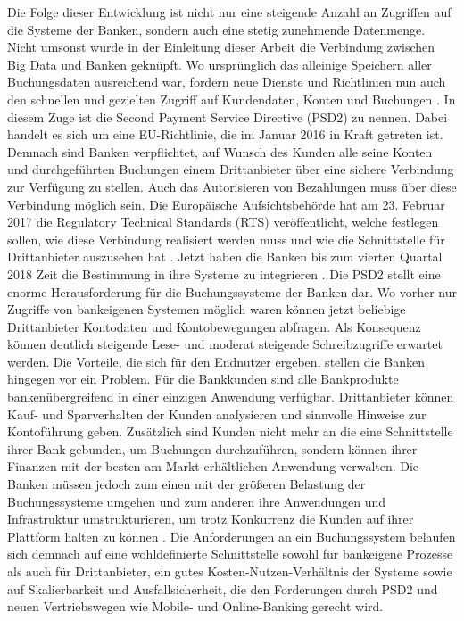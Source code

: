 \documentclass[12pt,oneside,a4paper,parskip]{scrbook}
\begin{document}
Die Folge dieser Entwicklung ist nicht nur eine steigende Anzahl an Zugriffen auf die Systeme der Banken, sondern auch eine stetig zunehmende Datenmenge. Nicht umsonst wurde in der Einleitung dieser Arbeit die Verbindung zwischen Big Data und Banken geknüpft. Wo ursprünglich das alleinige Speichern aller Buchungsdaten ausreichend war, fordern neue Dienste und Richtlinien nun auch den schnellen und gezielten Zugriff auf Kundendaten, Konten und Buchungen \cite{bigdataBigStorage}. In diesem Zuge ist die Second Payment Service Directive (PSD2) zu nennen. Dabei handelt es sich um eine EU-Richtlinie, die im Januar 2016 in Kraft getreten ist. Demnach sind Banken verpflichtet, auf Wunsch des Kunden alle seine Konten und durchgeführten Buchungen einem Drittanbieter über eine sichere Verbindung zur Verfügung zu stellen. Auch das Autorisieren von Bezahlungen muss über diese Verbindung möglich sein. Die Europäische Aufsichtsbehörde hat am 23. Februar 2017 die Regulatory Technical Standards (RTS) veröffentlicht, welche festlegen sollen, wie diese Verbindung realisiert werden muss und wie die Schnittstelle für Drittanbieter auszusehen hat \cite{rts}. Jetzt haben die Banken bis zum vierten Quartal 2018 Zeit die Bestimmung in ihre Systeme zu integrieren \cite{eu-psd2}\cite{psd2dk}. Die PSD2 stellt eine enorme Herausforderung für die Buchungssysteme der Banken dar. Wo vorher nur Zugriffe von bankeigenen Systemen möglich waren können jetzt beliebige Drittanbieter Kontodaten und Kontobewegungen abfragen. Als Konsequenz können deutlich steigende Lese- und moderat steigende Schreibzugriffe erwartet werden. Die Vorteile, die sich für den Endnutzer ergeben, stellen die Banken hingegen vor ein Problem. Für die Bankkunden sind alle Bankprodukte bankenübergreifend in einer einzigen Anwendung verfügbar. Drittanbieter können Kauf- und Sparverhalten der Kunden analysieren und sinnvolle Hinweise zur Kontoführung geben. Zusätzlich sind Kunden nicht mehr an die eine Schnittstelle ihrer Bank gebunden, um Buchungen durchzuführen, sondern können ihrer Finanzen mit der besten am Markt erhältlichen Anwendung verwalten. Die Banken müssen jedoch zum einen mit der größeren Belastung der Buchungssysteme umgehen und zum anderen ihre Anwendungen und Infrastruktur umstrukturieren, um trotz Konkurrenz die Kunden auf ihrer Plattform halten zu können \cite{psd2vid}.
Die Anforderungen an ein Buchungssystem belaufen sich demnach auf eine wohldefinierte Schnittstelle sowohl für bankeigene Prozesse als auch für Drittanbieter, ein gutes Kosten-Nutzen-Verhältnis der Systeme sowie auf Skalierbarkeit und Ausfallsicherheit, die den Forderungen durch PSD2 und neuen Vertriebswegen wie Mobile- und Online-Banking gerecht wird.
\end{document}
